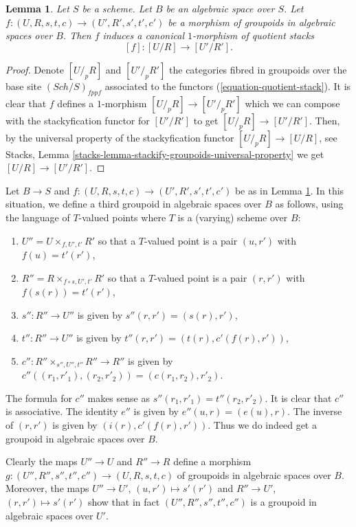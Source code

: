 \documentclass{stacks-project}
\theoremstyle{plain}
\newtheorem{lemma}[subsection]{Lemma}
\theoremstyle{definition}
\theoremstyle{remark}
\numberwithin{equation}{subsection}
\def\Sch{\mathit{Sch}}
\begin{document}
\begin{lemma}
\label{lemma-quotient-stack-functorial}
Let $S$ be a scheme. Let $B$ be an algebraic space over $S$.
Let $f : (U, R, s, t, c) \to (U', R', s', t', c')$ be a morphism of
groupoids in algebraic spaces over $B$.
Then $f$ induces a canonical $1$-morphism of quotient stacks
$$
[f] : [U/R] \longrightarrow [U'/R'].
$$
\end{lemma}

\begin{proof}
Denote $[U/_{\!p}R]$ and $[U'/_{\!p}R']$ the categories fibred
in groupoids over the base site $(\Sch/S)_{fppf}$ associated to the
functors (\ref{equation-quotient-stack}). It is clear that $f$ defines
a $1$-morphism $[U/_{\!p}R] \to [U'/_{\!p}R']$ which we can compose
with the stackyfication functor for $[U'/R']$ to get $[U/_{\!p}R] \to [U'/R']$.
Then, by the universal property of the stackyfication functor
$[U/_{\!p}R] \to [U/R]$, see
Stacks, Lemma \ref{stacks-lemma-stackify-groupoids-universal-property}
we get $[U/R] \to [U'/R']$.
\end{proof}

\noindent
Let $B \to S$ and $f : (U, R, s, t, c) \to (U', R', s', t', c')$ be as in
Lemma \ref{lemma-quotient-stack-functorial}.
In this situation, we define a third groupoid in algebraic spaces over
$B$ as follows, using the language of $T$-valued points where $T$
is a (varying) scheme over $B$:
\begin{enumerate}
\item $U'' = U \times_{f, U', t'} R'$ so that a $T$-valued point is
a pair $(u, r')$ with $f(u) = t'(r')$,
\item $R'' = R \times_{f \circ s, U', t'} R'$ so that a $T$-valued point is
a pair $(r, r')$ with $f(s(r)) = t'(r')$,
\item $s'' : R'' \to U''$ is given by $s''(r, r') = (s(r), r')$,
\item $t'' : R'' \to U''$ is given by $t''(r, r') = (t(r), c'(f(r), r'))$,
\item $c'' : R'' \times_{s'', U'', t''} R'' \to R''$ is given by
$c''((r_1, r'_1), (r_2, r'_2)) = (c(r_1, r_2), r'_2)$.
\end{enumerate}
The formula for $c''$ makes sense as $s''(r_1, r'_1) = t''(r_2, r'_2)$.
It is clear that $c''$ is associative. The identity $e''$ is given by
$e''(u, r) = (e(u), r)$. The inverse of $(r, r')$ is given by
$(i(r), c'(f(r), r'))$. Thus we do indeed get a groupoid
in algebraic spaces over $B$.

\medskip\noindent
Clearly the maps $U'' \to U$ and $R'' \to R$ define a morphism
$g : (U'', R'', s'', t'', c'') \to (U, R, s, t, c)$
of groupoids in algebraic spaces over $B$. Moreover, the maps
$U'' \to U'$, $(u, r') \mapsto s'(r')$ and
$R'' \to U'$, $(r, r') \mapsto s'(r')$ show that in fact
$(U'', R'', s'', t'', c'')$ is a groupoid in algebraic spaces over $U'$.
\end{document}
